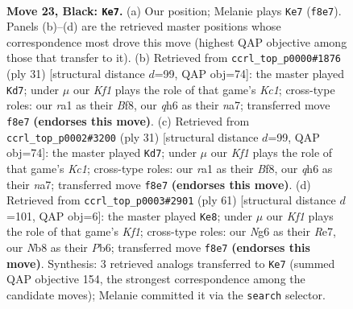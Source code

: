 \documentclass[11pt]{article}
\begin{document}
\clearpage

\begin{figure}[p]\centering
\begin{subfigure}{0.46\textwidth}\centering
\resizebox{\linewidth}{!}{%
\newchessgame
\chessboard[
  setfen={rnb1rk2/1p3p1p/4p1nQ/p1P1P3/P4P2/8/2q1B3/R1B1K1NR b KQ - 1 23},
  showmover=false,
  pgfstyle=straightmove, color=movearrow, markmove={f8-e7}
]}
\caption{}
\end{subfigure}\hfill
\begin{subfigure}{0.46\textwidth}\centering
\resizebox{\linewidth}{!}{%
\newchessgame
\chessboard[
  setfen={2kr1b1r/N1p3pp/1np2p2/4p3/2q5/1Q4PP/P3PP2/1RB2RK1 b - - 0 16},
  showmover=false,
  pgfstyle=straightmove, color=movearrow, markmove={c8-d7}
]}
\caption{}
\end{subfigure}
\\[4pt]
\begin{subfigure}{0.46\textwidth}\centering
\resizebox{\linewidth}{!}{%
\newchessgame
\chessboard[
  setfen={2kr1b1r/N1p3pp/1np2p2/4p3/2q5/1Q4PP/P3PP2/1RB2RK1 b - - 0 16},
  showmover=false,
  pgfstyle=straightmove, color=movearrow, markmove={c8-d7}
]}
\caption{}
\end{subfigure}\hfill
\begin{subfigure}{0.46\textwidth}\centering
\resizebox{\linewidth}{!}{%
\newchessgame
\chessboard[
  setfen={2r2k2/2p1rp2/1p1pnQ2/p3P2p/2q5/7P/PP4PK/2BB1R2 b - - 1 31},
  showmover=false,
  pgfstyle=straightmove, color=movearrow, markmove={f8-e8}
]}
\caption{}
\end{subfigure}
\caption{\textbf{Move 23, Black: \texttt{Ke7}.} (a) Our position; Melanie plays \texttt{Ke7} (\texttt{f8e7}). Panels (b)--(d) are the retrieved master positions whose correspondence most drove this move (highest QAP objective among those that transfer to it). (b) Retrieved from \texttt{ccrl\_top\_p0000\#1876} (ply 31) [structural distance $d$=99, QAP obj=74]: the master played \texttt{Kd7}; under $\mu$ our \emph{Kf1} plays the role of that game's \emph{Kc1}; cross-type roles: our \emph{r}a1 as their \emph{B}f8, our \emph{q}h6 as their \emph{n}a7; transferred move \texttt{f8e7} \textbf{(endorses this move)}. (c) Retrieved from \texttt{ccrl\_top\_p0002\#3200} (ply 31) [structural distance $d$=99, QAP obj=74]: the master played \texttt{Kd7}; under $\mu$ our \emph{Kf1} plays the role of that game's \emph{Kc1}; cross-type roles: our \emph{r}a1 as their \emph{B}f8, our \emph{q}h6 as their \emph{n}a7; transferred move \texttt{f8e7} \textbf{(endorses this move)}. (d) Retrieved from \texttt{ccrl\_top\_p0003\#2901} (ply 61) [structural distance $d$=101, QAP obj=6]: the master played \texttt{Ke8}; under $\mu$ our \emph{Kf1} plays the role of that game's \emph{Kf1}; cross-type roles: our \emph{N}g6 as their \emph{R}e7, our \emph{N}b8 as their \emph{P}b6; transferred move \texttt{f8e7} \textbf{(endorses this move)}. Synthesis: 3 retrieved analogs transferred to \texttt{Ke7} (summed QAP objective 154, the strongest correspondence among the candidate moves); Melanie committed it via the \texttt{search} selector.}
\label{fig:thought-m45}
\end{figure}
\end{document}
